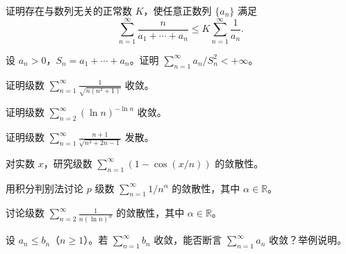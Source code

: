 \noindent\begin{minipage}{\textwidth}
证明存在与数列无关的正常数 $K$，使任意正数列 $\{a_n\}$ 满足\[\sum_{n=1}^{\infty}\frac n{a_1+\cdots+a_n}\le K\sum_{n=1}^{\infty}\frac1{a_n}.\]
\end{minipage}\par\vfill
\newpage
\noindent\begin{minipage}{\textwidth}
设 $a_n>0$，$S_n=a_1+\cdots+a_n$。证明 $\sum_{n=1}^{\infty}a_n/S_n^2<+\infty$。
\end{minipage}\par\vfill
\noindent\begin{minipage}{\textwidth}
证明级数 $\displaystyle\sum_{n=1}^{\infty}\frac1{\sqrt{n(n^2+1)}}$ 收敛。
\end{minipage}\par\vfill
\noindent\begin{minipage}{\textwidth}
证明级数 $\sum_{n=2}^{\infty}(\ln n)^{-\ln n}$ 收敛。
\end{minipage}\par\vfill
\newpage
\noindent\begin{minipage}{\textwidth}
证明级数 $\displaystyle\sum_{n=1}^{\infty}\frac{n+1}{\sqrt{n^3+2n-1}}$ 发散。
\end{minipage}\par\vfill
\noindent\begin{minipage}{\textwidth}
对实数 $x$，研究级数 $\sum_{n=1}^{\infty}(1-\cos(x/n))$ 的敛散性。
\end{minipage}\par\vfill
\noindent\begin{minipage}{\textwidth}
用积分判别法讨论 $p$ 级数 $\sum_{n=1}^{\infty}1/n^\alpha$ 的敛散性，其中 $\alpha\in\mathbb R$。
\end{minipage}\par\vfill
\newpage
\noindent\begin{minipage}{\textwidth}
讨论级数 $\displaystyle\sum_{n=2}^{\infty}\frac1{n(\ln n)^\alpha}$ 的敛散性，其中 $\alpha\in\mathbb R$。
\end{minipage}\par\vfill
\noindent\begin{minipage}{\textwidth}
设 $a_n\le b_n$（$n\ge1$）。若 $\sum_{n=1}^{\infty}b_n$ 收敛，能否断言 $\sum_{n=1}^{\infty}a_n$ 收敛？举例说明。
\end{minipage}\par\vfill
